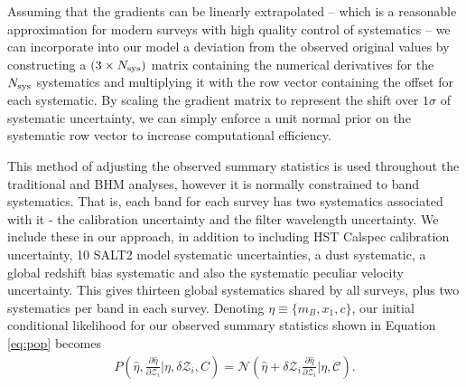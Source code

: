 \documentclass[a4paper,fleqn,usenatbib]{mnras}
\newcommand{\cov}{\mathcal{C}}
\newcommand{\Z}{\mathcal{Z}}
\begin{document}
Assuming that the gradients can be linearly extrapolated -- which is a reasonable approximation for modern surveys with high quality control of systematics -- we can incorporate into our model a deviation from the observed original values by constructing a $(3 \times N_{\rm sys})$ matrix containing the numerical derivatives for the $N_{\rm sys}$ systematics and multiplying it with the row vector containing the offset for each systematic. By scaling the gradient matrix to represent the shift over $1\sigma$ of systematic uncertainty, we can simply enforce a unit normal prior on the systematic row vector to increase computational efficiency.

This method of adjusting the observed summary statistics is used throughout the traditional and BHM analyses, however it is normally constrained to band systematics. That is, each band for each survey has two systematics associated with it - the calibration uncertainty and the filter wavelength uncertainty. We include these in our approach, in addition to including HST Calspec calibration uncertainty, 10 SALT2 model systematic uncertainties, a dust systematic, a global redshift bias systematic and also the systematic peculiar velocity uncertainty. This gives thirteen global systematics shared by all surveys, plus two systematics per band in each survey. Denoting $\eta \equiv \lbrace m_B, x_1, c \rbrace$, our initial conditional likelihood for our observed summary statistics shown in Equation \eqref{eq:pop} becomes
\begin{align}
P\left(\hat{\eta}, \frac{\partial \hat{\eta}}{\partial \Z_i} | \eta, \delta \Z_i, C\right) = \mathcal{N}\left(\hat{\eta} + \delta \Z_i \frac{\partial \hat{\eta}}{\partial \Z_i}|\eta,\cov\right). \label{eq:l3}
\end{align}
\end{document}
